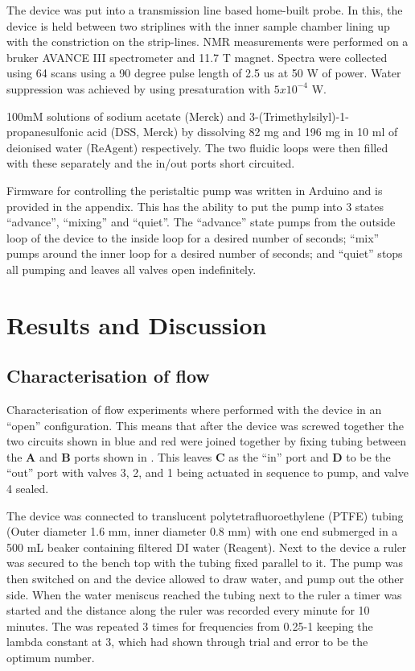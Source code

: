 The device was put into a transmission line based home-built probe. In this, the
device is held between two striplines with the inner sample chamber lining up with the
constriction on the strip-lines. NMR measurements were performed on a bruker AVANCE
III spectrometer and 11.7 T magnet. Spectra were collected using 64 scans using a 90
degree pulse length of 2.5 us at 50 W of power. Water suppression was achieved by
using presaturation with $5x10^{-4}$ W.

100mM solutions of sodium acetate (Merck) and 3-(Trimethylsilyl)-1-propanesulfonic
acid (DSS, Merck) by dissolving 82 mg and 196 mg in 10 ml of deionised water
(ReAgent)
respectively. The two fluidic loops were then filled with these separately and the
in/out ports short circuited.

Firmware for controlling the peristaltic pump was written in Arduino and is provided in the appendix.
This has the ability to put the pump into 3 states
“advance”, “mixing” and “quiet”. The “advance” state pumps from the outside loop of
the device to the inside loop for a desired number of seconds; “mix” pumps around the
inner loop for a desired number of seconds; and “quiet” stops all pumping and leaves
all valves open indefinitely.


\section{Results and Discussion}

\subsection{Characterisation of flow}

Characterisation of flow experiments where performed with the device in an “open”
configuration. This means that after the device was screwed together the two circuits shown
in blue and red were joined together by fixing tubing between the \textbf{A} and \textbf{B} ports shown in
. This leaves \textbf{C} as the “in” port and \textbf{D} to be the “out” port with valves 3, 2, and 1
being actuated in sequence to pump, and valve 4 sealed.

The device was connected to translucent polytetrafluoroethylene (PTFE) tubing (Outer
diameter 1.6 mm, inner diameter 0.8 mm) with one end submerged in a 500 mL beaker
containing filtered DI water (Reagent). Next to the device a ruler was secured to the bench
top with the tubing fixed parallel to it. The pump was then switched on and the device
allowed to draw water, and pump out the other side. When the water meniscus reached the tubing
next to the ruler a timer was started and the distance along the ruler was recorded every
minute for 10 minutes. The was repeated 3 times for frequencies from 0.25-1 keeping the
lambda constant at 3, which had shown through trial and error to be the optimum number.

